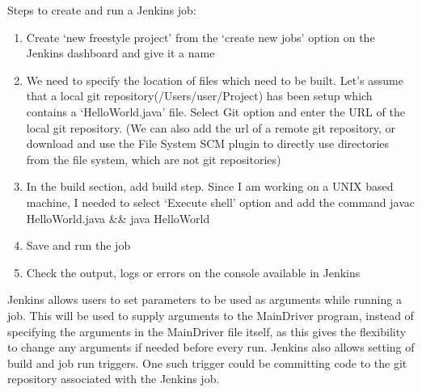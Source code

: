 Steps to create and run a Jenkins job:
\begin{enumerate}
	\item Create `new freestyle project' from the `create new jobs' option on the Jenkins dashboard and give it a name
	\item We need to specify the location of files which need to be built. Let's assume that a local git repository(/Users/user/Project) has been setup which contains a `HelloWorld.java' file. Select Git option and enter the URL of the local git repository. (We can also add the url of a remote git repository, or download and use the File System SCM plugin to directly use directories from the file system, which are not git repositories)
	\item In the build section, add build step. Since I am working on a UNIX based machine, I needed to select `Execute shell' option and add the command javac HelloWorld.java \&\& java HelloWorld
	\item Save and run the job
	\item Check the output, logs or errors on the console available in Jenkins
\end{enumerate}
Jenkins allows users to set parameters to be used as arguments while running a job. This will be used to supply arguments to the MainDriver program, instead of specifying the arguments in the MainDriver file itself, as this gives the flexibility to change any arguments if needed before every run. Jenkins also allows setting of build and job run triggers. One such trigger could be committing code to the git repository associated with the Jenkins job.

